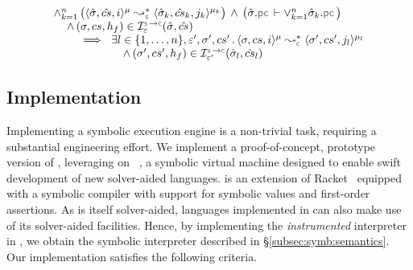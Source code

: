 \vspace*{-0.1cm}
\begin{corollary}[Verification]\label{corollary:verification}
$$
\begin{array}{l}
\wedge_{k=1}^n \, \big( \transabssemrule{\sstate, \scs, i}{\sstate_k, \scs_k, j_k}{\mode}{\mode_k}{\symbolic}  \big)
    \, \wedge \, \big( \sstate.\pcsel \vdash \vee_{k=1}^n \sstate_k.\pcsel \big)  \\  \quad
    \, \wedge \, (\jstate, \cs, \heap_f) \in \interpret{\symbconc}{\senv}(\sstate, \scs)
    \\ \qquad 
%
      \ \implies \ \exists l \in \{ 1, \ldots, n \}, \senv', \jstate', \cs' \, . \, 
           \transabssemrule{\jstate, \cs, i}{\jstate', \cs', j_l}{\mode}{\mode_l}{\concrete} \\ \qquad \qquad \qquad
           \, \wedge \, 
           (\jstate', \cs', \heap_f) \in \interpret{\symbconc}{\senv'}(\sstate_l, \scs_l)
\end{array}
$$
\end{corollary}

%

%
%
%

\vspace*{-0.3cm}
\subsection{Implementation}\label{subsec:jsil:analysis:implementation}


Implementing a symbolic execution engine is a non-trivial 
task, requiring a substantial engineering effort. 
% 
% 
We implement a proof-of-concept, prototype version of \cosette, leveraging on 
\rosette~\cite{Rosette1,Rosette2}, a symbolic virtual machine designed to 
enable swift development of new 
solver-aided languages. 
%
\rosette is an extension of Racket~\cite{racket} equipped with a symbolic compiler with support 
for symbolic values and first-order assertions. As \rosette is itself solver-aided, languages 
implemented in \rosette can also make use of its solver-aided facilities. 
Hence, by implementing the \emph{instrumented} \jsil interpreter in \rosette, we obtain the symbolic 
interpreter described in \S\ref{subsec:symb:semantics}. %
%
Our implementation satisfies the following criteria.

